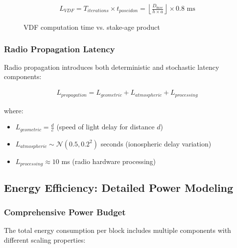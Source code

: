 \documentclass[11pt,a4paper]{article}
\begin{document}
\begin{align}
L_{VDF} = T_{iterations} \times t_{poseidon} = \left\lfloor\frac{D_{base}}{h \times a}\right\rfloor \times 0.8 \text{ ms}
\end{align}

\begin{figure}[h]
\centering
{}
\caption{VDF computation time vs. stake-age product}
\end{figure}

\subsubsection{Radio Propagation Latency}

Radio propagation introduces both deterministic and stochastic latency components:

\begin{align}
L_{propagation} = L_{geometric} + L_{atmospheric} + L_{processing}
\end{align}

where:
\begin{itemize}
\item $L_{geometric} = \frac{d}{c}$ (speed of light delay for distance $d$)
\item $L_{atmospheric} \sim \mathcal{N}(0.5, 0.2^2)$ seconds (ionospheric delay variation)
\item $L_{processing} \approx 10$ ms (radio hardware processing)
\end{itemize}

\subsection{Energy Efficiency: Detailed Power Modeling}

\subsubsection{Comprehensive Power Budget}

The total energy consumption per block includes multiple components with different scaling properties:
\end{document}
